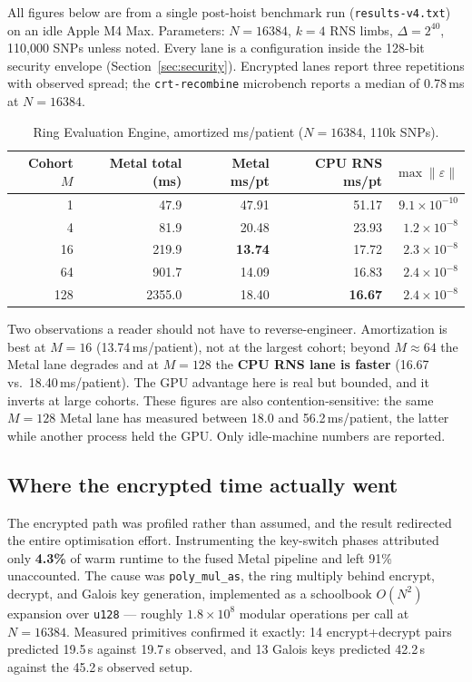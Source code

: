 \documentclass[11pt,a4paper]{article}
\DeclareRobustCommand{\code}[1]{\texttt{#1}}
\DeclareRobustCommand{\file}[1]{\texttt{#1}}
\begin{document}
All figures below are from a single post-hoist benchmark run
(\file{results-v4.txt}) on an idle Apple M4 Max. Parameters: $N = 16384$, $k{=}4$
RNS limbs, $\Delta = 2^{40}$, 110{,}000 SNPs unless noted. Every lane is a
configuration inside the 128-bit security envelope (Section~\ref{sec:security}).
Encrypted lanes report three repetitions with observed spread; the
\code{crt-recombine} microbench reports a median of 0.78\,ms at $N = 16384$.

\begin{table}[ht]
\centering
\caption{Ring Evaluation Engine, amortized ms/patient ($N{=}16384$, 110k SNPs).}
\label{tab:ring}
\small
\begin{tabular}{@{}rrrrr@{}}
\toprule
Cohort $M$ & Metal total (ms) & Metal ms/pt & CPU RNS ms/pt & $\max\|\varepsilon\|$ \\
\midrule
1   & 47.9  & 47.91 & 51.17 & $9.1\times10^{-10}$ \\
4   & 81.9  & 20.48 & 23.93 & $1.2\times10^{-8}$ \\
16  & 219.9 & \textbf{13.74} & 17.72 & $2.3\times10^{-8}$ \\
64  & 901.7 & 14.09 & 16.83 & $2.4\times10^{-8}$ \\
128 & 2355.0 & 18.40 & \textbf{16.67} & $2.4\times10^{-8}$ \\
\bottomrule
\end{tabular}
\end{table}

Two observations a reader should not have to reverse-engineer. Amortization is best
at $M = 16$ (13.74\,ms/patient), not at the largest cohort; beyond $M \approx 64$
the Metal lane degrades and at $M = 128$ the \textbf{CPU RNS lane is faster}
(16.67 vs.\ 18.40\,ms/patient). The GPU advantage here is real but bounded, and it
inverts at large cohorts. These figures are also contention-sensitive: the same
$M{=}128$ Metal lane has measured between 18.0 and 56.2\,ms/patient, the latter
while another process held the GPU. Only idle-machine numbers are reported.

\subsection{Where the encrypted time actually went}
\label{sec:encrypted-time}

The encrypted path was profiled rather than assumed, and the result redirected the
entire optimisation effort. Instrumenting the key-switch phases attributed only
\textbf{4.3\%} of warm runtime to the fused Metal pipeline and left 91\%
unaccounted. The cause was \code{poly\_mul\_as}, the ring multiply behind encrypt,
decrypt, and Galois key generation, implemented as a schoolbook $O(N^2)$ expansion
over \code{u128} --- roughly $1.8\times10^{8}$ modular operations per call at
$N = 16384$. Measured primitives confirmed it exactly: 14 encrypt+decrypt pairs
predicted 19.5\,s against 19.7\,s observed, and 13 Galois keys predicted 42.2\,s
against the 45.2\,s observed setup.
\end{document}
